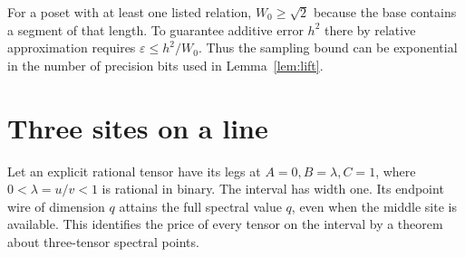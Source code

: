 \documentclass[11pt,letterpaper]{article}
\theoremstyle{definition}
\begin{document}
For a poset with at least one listed relation, \(W_0\ge\sqrt2\) because
the base contains a segment of that length. To guarantee additive error
\(h^2\) there by relative approximation requires
\(\varepsilon\le h^2/W_0\). Thus the sampling bound can be exponential
in the number of precision bits used in Lemma~\ref{lem:lift}.

\section{Three sites on a line}
\label{sec:line}

Let an explicit rational tensor have its legs at \(A=0,B=\lambda,C=1\),
where \(0<\lambda=u/v<1\) is rational in binary. The interval has width
one. Its endpoint wire of dimension \(q\) attains the full spectral value
\(q\), even when the middle site is available. This identifies the price of
every tensor on the interval by a theorem about three-tensor spectral points.
\end{document}
